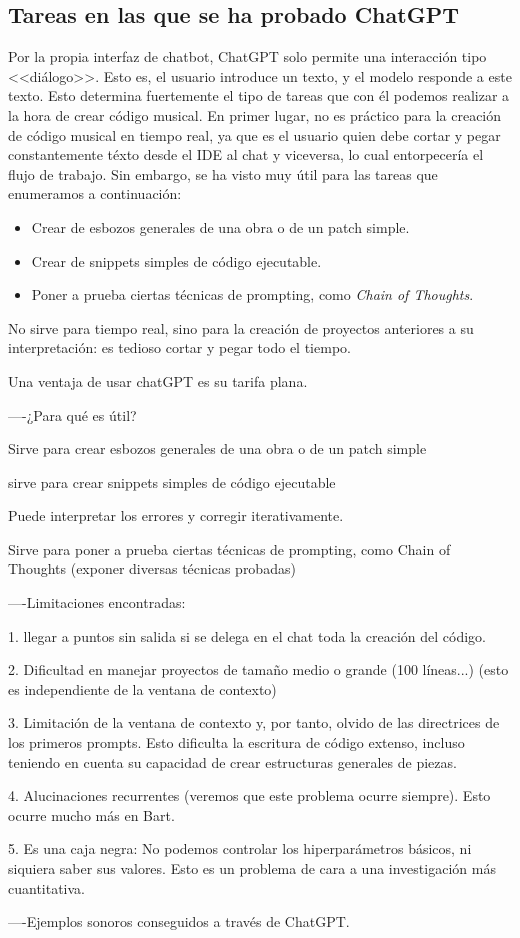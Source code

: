 \subsection{Tareas en las que se ha probado ChatGPT}
Por la propia interfaz de chatbot, ChatGPT solo permite una interacción tipo <<diálogo>>. Esto es, el usuario introduce un texto, y el modelo responde a este texto. Esto determina fuertemente el tipo de tareas que con él podemos realizar a la hora de crear código musical. En primer lugar, no es práctico para la creación de código musical en tiempo real, ya que es el usuario quien debe cortar y pegar constantemente téxto desde el IDE al chat y viceversa, lo cual entorpecería el flujo de trabajo. Sin embargo, se ha visto muy útil para las tareas que enumeramos a continuación:

\begin{itemize}
    \item Crear de esbozos generales de una obra o de un patch simple.
    \item Crear de snippets simples de código ejecutable.
    \item Poner a prueba ciertas técnicas de prompting, como \textit{Chain of Thoughts}.
\end{itemize}


No sirve para tiempo real, sino para la creación de proyectos anteriores a su interpretación: es tedioso cortar y pegar todo el tiempo.

Una ventaja de usar chatGPT es su tarifa plana.

----¿Para qué es útil?

Sirve para crear esbozos generales de una obra o de un patch simple

sirve para crear snippets simples de código ejecutable

Puede interpretar los errores y corregir iterativamente.

Sirve para poner a prueba ciertas técnicas de prompting, como Chain of Thoughts (exponer diversas técnicas probadas)


----Limitaciones encontradas:

1. llegar a puntos sin salida si se delega en el chat toda la creación del código.

2. Dificultad en manejar proyectos de tamaño medio o grande (100 líneas...) (esto es independiente de la ventana de contexto)

3. Limitación de la ventana de contexto y, por tanto, olvido de las directrices de los primeros prompts. Esto dificulta la escritura de código extenso, incluso teniendo en cuenta su capacidad de crear estructuras generales de piezas.

4. Alucinaciones recurrentes (veremos que este problema ocurre siempre). Esto ocurre mucho más en Bart.

5. Es una caja negra: No podemos controlar los hiperparámetros básicos, ni siquiera saber sus valores. Esto es un problema de cara a una investigación más cuantitativa.


----Ejemplos sonoros conseguidos a través de ChatGPT.